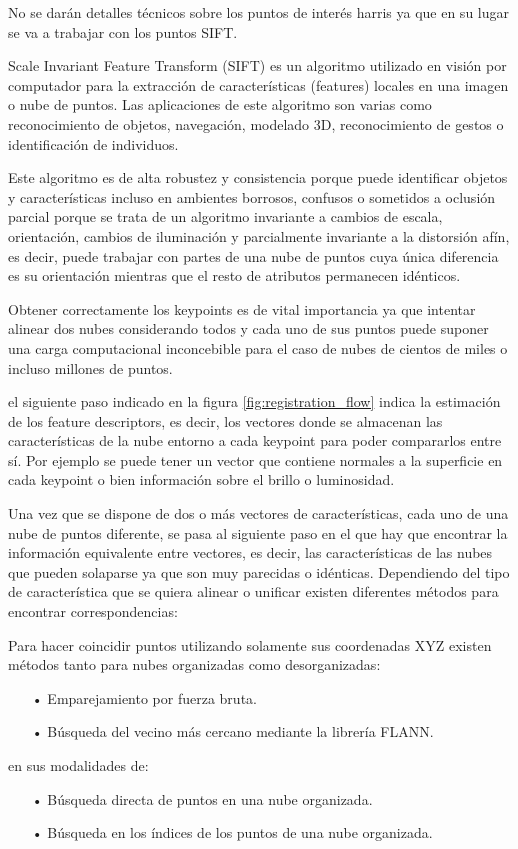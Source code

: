 No se darán detalles técnicos sobre los puntos de interés harris ya que en su lugar se va a trabajar con los puntos SIFT. 

Scale Invariant Feature Transform (SIFT) es un algoritmo utilizado en visión por computador para la extracción de características (features) locales en una imagen o nube de puntos. Las aplicaciones de este algoritmo son varias como reconocimiento de objetos, navegación, modelado 3D, reconocimiento de gestos o identificación de individuos.

Este algoritmo es de alta robustez y consistencia porque puede identificar objetos y características incluso en ambientes borrosos, confusos o sometidos a oclusión parcial porque se trata de un algoritmo invariante a cambios de escala, orientación, cambios de iluminación y parcialmente invariante a la distorsión afín, es decir, puede trabajar con partes de una nube de puntos cuya única diferencia es su orientación mientras que el resto de atributos permanecen idénticos.

Obtener correctamente los keypoints es de vital importancia ya que intentar alinear dos nubes considerando todos y cada uno de sus puntos puede suponer una carga computacional inconcebible para el caso de nubes de cientos de miles o incluso millones de puntos. 

el siguiente paso indicado en la figura \ref{fig:registration_flow} indica la estimación de los feature descriptors, es decir, los vectores donde se almacenan las características de la nube entorno a cada keypoint para poder compararlos entre sí. Por ejemplo se puede tener un vector que contiene normales a la superficie en cada keypoint o bien información sobre el brillo o luminosidad.

Una vez que se dispone de dos o más vectores de características, cada uno de una nube de puntos diferente, se pasa al siguiente paso en el que hay que encontrar la información equivalente entre vectores, es decir, las características de las nubes que pueden solaparse ya que son muy parecidas o idénticas. Dependiendo del tipo de característica que se quiera alinear o unificar existen diferentes métodos para encontrar correspondencias:

Para hacer coincidir puntos utilizando solamente sus coordenadas XYZ existen métodos tanto para nubes organizadas como desorganizadas:
\begin{itemize}
\item[•]Emparejamiento por fuerza bruta.
\item[•]Búsqueda del vecino más cercano mediante la librería FLANN.
\end{itemize}
en sus modalidades de:
\begin{itemize}
\item[•]Búsqueda directa de puntos en una nube organizada.
\item[•]Búsqueda en los índices de los puntos de una nube organizada.
\end{itemize}

